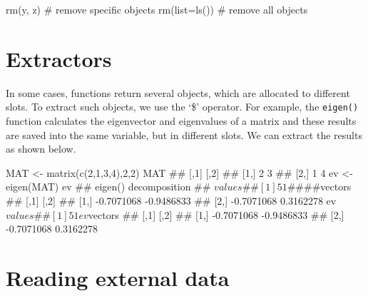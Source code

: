 \documentclass[a4paper,12pt,oneside]{book}
\newenvironment{Shaded}{\begin{snugshade}}{\end{snugshade}}
\newcommand{\DecValTok}[1]{#1}
\newcommand{\SpecialCharTok}[1]{#1}
\newcommand{\CommentTok}[1]{#1}
\newcommand{\DocumentationTok}[1]{#1}
\newcommand{\OtherTok}[1]{#1}
\newcommand{\FunctionTok}[1]{#1}
\newcommand{\AttributeTok}[1]{#1}
\newcommand{\NormalTok}[1]{#1}
\begin{document}
\begin{Shaded}
\begin{Highlighting}[]
\FunctionTok{rm}\NormalTok{(y, z) }\CommentTok{\# remove specific objects}
\FunctionTok{rm}\NormalTok{(}\AttributeTok{list=}\FunctionTok{ls}\NormalTok{()) }\CommentTok{\# remove all objects}
\end{Highlighting}
\end{Shaded}

\hypertarget{extractors}{%
\section{Extractors}\label{extractors}}

In some cases, functions return several objects, which are allocated to different slots. To extract such objects, we use the `\$' operator. For example, the \texttt{eigen()} function calculates the eigenvector and eigenvalues of a matrix and these results are saved into the same variable, but in different slots. We can extract the results as shown below.

\begin{Shaded}
\begin{Highlighting}[]
\NormalTok{MAT  }\OtherTok{\textless{}{-}}  \FunctionTok{matrix}\NormalTok{(}\FunctionTok{c}\NormalTok{(}\DecValTok{2}\NormalTok{,}\DecValTok{1}\NormalTok{,}\DecValTok{3}\NormalTok{,}\DecValTok{4}\NormalTok{),}\DecValTok{2}\NormalTok{,}\DecValTok{2}\NormalTok{)}
\NormalTok{MAT}
\DocumentationTok{\#\#      [,1] [,2]}
\DocumentationTok{\#\# [1,]    2    3}
\DocumentationTok{\#\# [2,]    1    4}
\NormalTok{ev  }\OtherTok{\textless{}{-}}  \FunctionTok{eigen}\NormalTok{(MAT)}
\NormalTok{ev}
\DocumentationTok{\#\# eigen() decomposition}
\DocumentationTok{\#\# $values}
\DocumentationTok{\#\# [1] 5 1}
\DocumentationTok{\#\# }
\DocumentationTok{\#\# $vectors}
\DocumentationTok{\#\#            [,1]       [,2]}
\DocumentationTok{\#\# [1,] {-}0.7071068 {-}0.9486833}
\DocumentationTok{\#\# [2,] {-}0.7071068  0.3162278}
\NormalTok{ev}\SpecialCharTok{$}\NormalTok{values}
\DocumentationTok{\#\# [1] 5 1}
\NormalTok{ev}\SpecialCharTok{$}\NormalTok{vectors}
\DocumentationTok{\#\#            [,1]       [,2]}
\DocumentationTok{\#\# [1,] {-}0.7071068 {-}0.9486833}
\DocumentationTok{\#\# [2,] {-}0.7071068  0.3162278}
\end{Highlighting}
\end{Shaded}

\hypertarget{reading-external-data}{%
\section{Reading external data}\label{reading-external-data}}
\end{document}

